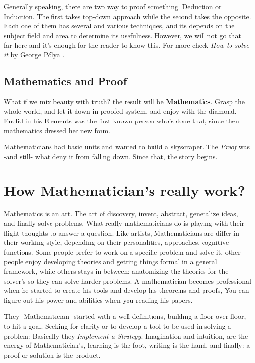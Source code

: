 Generally speaking, there are two way to proof something: Deduction or Induction. The first takes top-down approach while the second takes the opposite. Each one of them has several and various techniques, and its depends on the subject field and area to determine its usefulness. However, we will not go that far here and it's enough for the reader to know this. For more check {\it How to solve it} by George Pólya \cite{polyasolve}.

\subsection{Mathematics and Proof}
What if we mix beauty with truth? the result will be {\bf Mathematics}. Grasp the whole world, and let it down in proofed system, and enjoy with the diamond. Euclid in his Elements\cite{euclid1956elements} was the first known person who's done that, since then mathematics dressed her new form.

Mathematicians had basic units and wanted to build a skyscraper. The {\it Proof} was -and still- what deny it from falling down. Since that, the story begins.

\section{How Mathematician's really work?}\label{intro.work}
Mathematics is an art. The art of discovery, invent, abstract, generalize ideas, and finally solve problems. What really mathematicians do is playing with their flight thoughts to answer a question. Like artists, Mathematicians are  differ in their working style, depending on their personalities, approaches, cognitive functions. Some people prefer to work on a specific problem and solve it, other people enjoy developing theories and getting things formal in a general framework, while others stays in between: anatomizing the theories for the solver's so they can solve harder problems. A mathematician becomes professional when he started to create his tools and develop his theorems and proofs, You can figure out his power and abilities when you reading his papers.

They -Mathematician- started with a well definitions, building a floor over floor, to hit a goal. Seeking for clarity or to develop a tool to be used in solving a problem: Basically they {\it Implement a Strategy}. Imagination and intuition, are the energy of Mathematician's, learning is the foot, writing is the hand, and finally: a proof or solution is the product.
